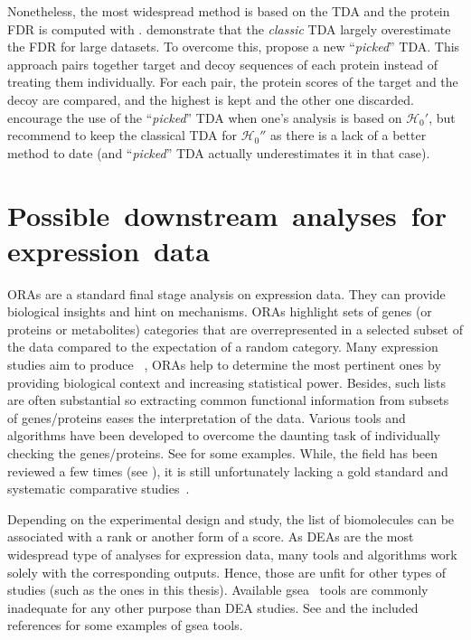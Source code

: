 Nonetheless, the most widespread method is based on the \gls{TDA}
and the protein \gls{FDR} is computed with .
\citet{Savitski2015-fx} demonstrate that the \emph{classic} \gls{TDA}
largely overestimate the \gls{FDR} for large datasets.
To overcome this,
\citet{Savitski2015-fx} propose a new \enquote{\emph{picked}} \gls{TDA}.
This approach pairs together target and decoy sequences of each protein
instead of treating them individually.
For each pair, the protein scores of the target and the decoy are compared,
and the highest is kept and the other one discarded.
\citet{The2016-ua} encourage the use of the \enquote{\emph{picked}} \gls{TDA}
when one's analysis is based on $\mathcal{H}_0'$,
but recommend to keep the classical \gls{TDA} for $\mathcal{H}_0''$
as there is a lack of a better method to date
(and \enquote{\emph{picked}} \gls{TDA} actually underestimates it in that case).\mybr\

\section{Possible~downstream~analyses~for~expression~data}\label{sec:enrichmentAnalysis}

\Glspl{ORA} are a standard final stage analysis on expression data.
They can provide biological insights and hint on mechanisms.
\Glspl{ORA} highlight sets of genes (or proteins or metabolites) categories
that are overrepresented in a selected subset of the data
compared to the expectation of a random category.
Many expression studies aim to produce ~,
\glspl{ORA} help to determine the most pertinent ones
by providing biological context and increasing statistical power.
Besides, such lists are often substantial
so extracting common functional information from subsets of genes/proteins eases
the interpretation of the data.
Various tools and algorithms have been developed
to overcome the daunting task of individually checking the genes/proteins.
See \citet{Shi_Jing2015-yh} for some examples.
While, the field has been reviewed a few times
(see \citet{Khatri2005-su,Huang2009-zk,Khatri2012-ki}),
it is still unfortunately lacking a gold standard
and systematic comparative studies~.\mybr\

Depending on the experimental design and study,
the list of biomolecules can be associated with a rank or another form of a score.
As \glspl{DEA} are the most widespread type of analyses for expression data,
many tools and algorithms work solely with the corresponding outputs.
Hence, those are unfit for other types of studies
(such as the ones in this thesis).
Available \gls{gsea}~ tools are commonly inadequate
for any other purpose than \gls{DEA} studies.
See \citet{Tamayo2012-qw,Irizarry2009-sc}
and the included references for some examples of \gls{gsea} tools.\mybr\

